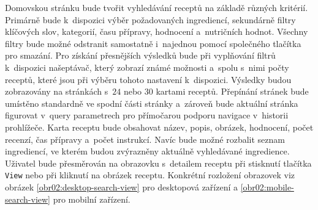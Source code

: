 Domovskou stránku bude tvořit vyhledávání receptů na základě různých kritérií. Primárně bude k~dispozici výběr požadovaných ingrediencí, sekundárně filtry klíčových slov, kategorií, času přípravy, hodnocení a~nutričních hodnot. Všechny filtry bude možné odstranit samostatně i~najednou pomocí společného tlačítka pro smazání. Pro získání přesnějších výsledků bude při vyplňování filtrů k~dispozici našeptávač, který zobrazí známé možnosti a~spolu s~nimi počty receptů, které jsou při výběru tohoto nastavení k~dispozici. Výsledky budou zobrazovány na stránkách s~$24$ nebo $30$ kartami receptů. Přepínání stránek bude umístěno standardně ve spodní části stránky a~zároveň bude aktuální stránka figurovat v~query parametrech pro přímočarou podporu navigace v~historii prohlížeče. Karta receptu bude obsahovat název, popis, obrázek, hodnocení, počet recenzí, čas přípravy a~počet instrukcí. Navíc bude možné rozbalit seznam ingrediencí, ve kterém budou zvýrazněny aktuálně vyhledávané ingredience. Uživatel bude přesměrován na obrazovku s~detailem receptu při stisknutí tlačítka \texttt{View} nebo při kliknutí na obrázek receptu. Konkrétní rozložení obrazovek viz obrázek \ref{obr02:desktop-search-view} pro desktopová zařízení a \ref{obr02:mobile-search-view} pro mobilní zařízení.

